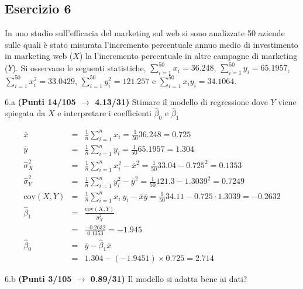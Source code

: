 \documentclass[
  11pt,
]{book}
\theoremstyle{mytheoremstyle}
\theoremstyle{mydefstyle}
\newenvironment{sol}
  {
  \begin{tcolorbox}[enhanced,breakable,arc=0.1mm,boxrule=1pt,colback=white,colframe=iblue,
  title=\bf \fontfamily{lmss}\selectfont \hspace{.5 cm} Soluzione,drop fuzzy shadow]

}{
\end{tcolorbox}
  }
\begin{document}
\subsection{Esercizio 6}\label{esercizio-6-26}

In uno studio sull'efficacia del marketing sul web si sono analizzate 50 aziende
sulle quali è stato misurata l'incremento percentuale annuo medio di investimento in marketing
web (\(X\)) la l'incremento percentuale in altre campagne di marketing (\(Y\)). Si osservano le seguenti statistiche, \(\sum_{i=1}^{50}x_i=36.248\), \(\sum_{i=1}^{50}y_i=65.1957\),
\(\sum_{i=1}^{50}x_i^2=33.0429\), \(\sum_{i=1}^{50}y_i^2=121.257\) e \(\sum_{i=1}^{50}x_iy_i=34.1064\).

6.a \textbf{(Punti 14/105 \(\rightarrow\) 4.13/31)} Stimare il modello di regressione dove \(Y\) viene spiegata da \(X\) e interpretare
i coefficienti \(\hat\beta_0\) e \(\hat\beta_1\)

\begin{sol}
\begin{eqnarray*}
           \bar x &=&\frac 1 n\sum_{i=1}^n x_i = \frac {1}{ 50 }  36.248 =  0.725 \\
           \bar y &=&\frac 1 n\sum_{i=1}^n y_i = \frac {1}{ 50 }  65.1957 =  1.304 \\
           \hat\sigma_X^2&=&\frac 1 n\sum_{i=1}^n x_i^2-\bar x^2=\frac {1}{ 50 }  33.04  - 0.725 ^2= 0.1353 \\
           \hat\sigma_Y^2&=&\frac 1 n\sum_{i=1}^n y_i^2-\bar y^2=\frac {1}{ 50 }  121.3  - 1.3039 ^2= 0.7249 \\
           \text{cov}(X,Y)&=&\frac 1 n\sum_{i=1}^n x_i~y_i-\bar x\bar y=\frac {1}{ 50 }  34.11 - 0.725 \cdot 1.3039 = -0.2632 \\
           \hat\beta_1 &=& \frac{\text{cov}(X,Y)}{\hat\sigma_X^2} \\
                    &=& \frac{ -0.2632 }{ 0.1353 }  =  -1.945 \\
           \hat\beta_0 &=& \bar y - \hat\beta_1 \bar x\\
                    &=&  1.304 - (-1.9451) \times  0.725 = 2.714 
         \end{eqnarray*}

\end{sol}

6.b \textbf{(Punti 3/105 \(\rightarrow\) 0.89/31)} Il modello si adatta bene ai dati?
\end{document}
